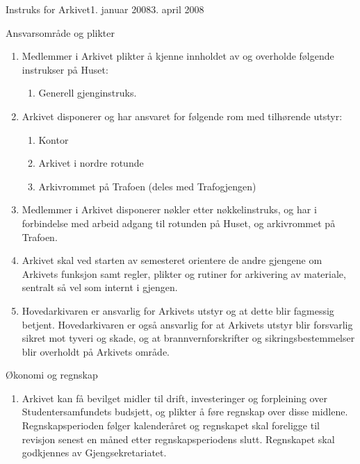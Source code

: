 \documentclass[../fsbok.tex]{subfiles}
\begin{document}
\begin{instruks}{Instruks for Arkivet}{1. januar 2008}{3. april 2008}
    \begin{instruksledd}{Ansvarsområde og plikter}
        \begin{enumerate}
            \item Medlemmer i Arkivet plikter å kjenne innholdet av og overholde følgende instrukser
                på Huset:
                \begin{enumerate}
                    \item Generell gjenginstruks.
                \end{enumerate}
            \item Arkivet disponerer og har ansvaret for følgende rom med tilhørende utstyr:
                \begin{enumerate}
                    \item Kontor
                    \item Arkivet i nordre rotunde
                    \item Arkivrommet på Trafoen (deles med Trafogjengen)
                \end{enumerate}
            \item Medlemmer i Arkivet disponerer nøkler etter nøkkelinstruks, og har i forbindelse
                med arbeid adgang til rotunden på Huset, og arkivrommet på Trafoen.
            \item Arkivet skal ved starten av semesteret orientere de andre gjengene om Arkivets
                funksjon samt regler, plikter og rutiner for arkivering av materiale, sentralt så vel som internt i gjengen.
            \item Hovedarkivaren er ansvarlig for Arkivets utstyr og at dette blir fagmessig
                betjent. Hovedarkivaren er også ansvarlig for at Arkivets utstyr blir forsvarlig sikret mot tyveri og skade, og at
                brannvernforskrifter og sikringsbestemmelser blir overholdt på Arkivets område.
        \end{enumerate}
    \end{instruksledd}

    \begin{instruksledd}{Økonomi og regnskap}
        \begin{enumerate}
            \item Arkivet kan få bevilget midler til drift, investeringer og forpleining over
                Studentersamfundets budsjett, og plikter å føre regnskap over disse midlene. Regnskapsperioden følger kalenderåret og
                regnskapet skal foreligge til revisjon senest en måned etter regnskapsperiodens slutt. Regnskapet
                skal godkjennes av Gjengsekretariatet.
        \end{enumerate}
    \end{instruksledd}


\end{instruks}
\end{document}
